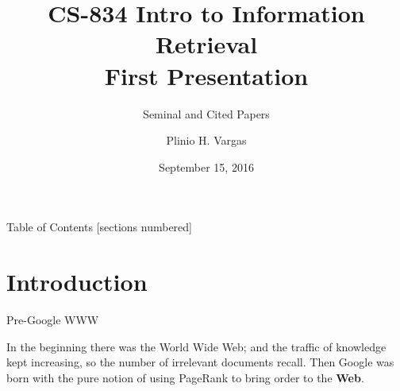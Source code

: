 \documentclass[10pt]{beamer}
\title{CS-834 Intro to Information Retrieval\\First Presentation}
\subtitle{Seminal and Cited Papers}
\date{September 15, 2016}
\author{Plinio H. Vargas}
\institute{Old Dominion University}
\begin{document}
\maketitle
\begin{frame}{Table of Contents}
  [sections numbered]
  \tableofcontents[hideallsubsections]
\end{frame}
\section{Introduction}

\begin{frame}[fragile]{Pre-Google WWW}

  In the beginning there was the \alert{World Wide Web}; and the traffic of knowledge kept increasing, so the number of irrelevant documents recall. Then \alert{Google} was born with the pure notion of using PageRank to bring order to the \textbf{Web}.

\end{frame}
\end{document}
